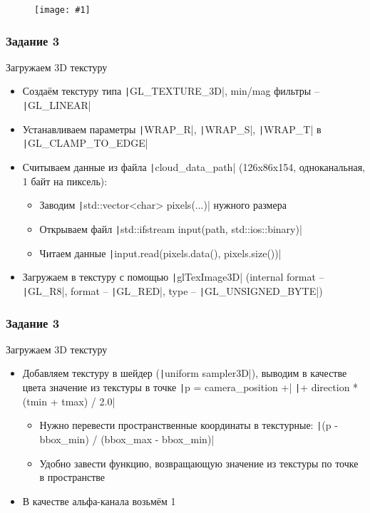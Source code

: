 \documentclass[10pt]{beamer}
\newcommand{\slideimage}[1]{
  \begin{figure}
    \begin{adjustbox}{width=\textwidth, totalheight=\textheight-2\baselineskip-2\baselineskip,keepaspectratio}
      \texttt{[image: \#1]}
    \end{adjustbox}
  \end{figure}
}
\begin{document}
\begin{frame}[fragile]
\slideimage{2.png}
\end{frame}

\begin{frame}[fragile]
\frametitle{Задание 3}
Загружаем 3D текстуру
\begin{itemize}
\item Создаём текстуру типа \texttt|GL_TEXTURE_3D|, min/mag фильтры -- \texttt|GL_LINEAR|
\item Устанавливаем параметры \texttt|WRAP_R|, \texttt|WRAP_S|, \texttt|WRAP_T| в \texttt|GL_CLAMP_TO_EDGE|
\item Считываем данные из файла \texttt|cloud_data_path| (126x86x154, одноканальная, 1 байт на пиксель):
\begin{itemize}
\item Заводим \texttt|std::vector<char> pixels(...)| нужного размера
\item Открываем файл \texttt|std::ifstream input(path, std::ios::binary)|
\item Читаем данные \texttt|input.read(pixels.data(), pixels.size())|
\end{itemize}
\item Загружаем в текстуру с помощью \texttt|glTexImage3D| (internal format -- \texttt|GL_R8|, format -- \texttt|GL_RED|, type -- \texttt|GL_UNSIGNED_BYTE|)
\end{itemize}
\end{frame}

\begin{frame}[fragile]
\frametitle{Задание 3}
Загружаем 3D текстуру
\begin{itemize}
\item Добавляем текстуру в шейдер (\texttt|uniform sampler3D|), выводим в качестве цвета значение из текстуры в точке \texttt|p = camera_position +|
\texttt|+ direction * (tmin + tmax) / 2.0|
\begin{itemize}
\item Нужно перевести пространственные координаты в текстурные: \texttt|(p - bbox_min) / (bbox_max - bbox_min)|
\item Удобно завести функцию, возвращающую значение из текстуры по точке в пространстве
\end{itemize}
\item В качестве альфа-канала возьмём 1
\end{itemize}
\end{frame}
\end{document}
